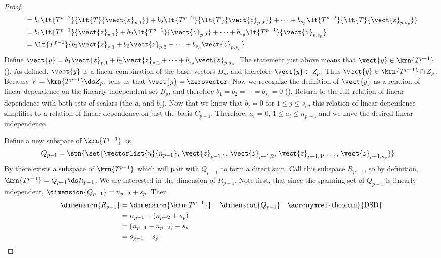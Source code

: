 \begin{proof}
\begin{align*}
%
&=
b_1\lt{T^{p-2}}{\lt{T}{\vect{z}_{p,1}}}+
b_2\lt{T^{p-2}}{\lt{T}{\vect{z}_{p,2}}}+
\cdots+
b_{s_p}\lt{T^{p-2}}{\lt{T}{\vect{z}_{p,s_p}}}\\
%
&=
b_1\lt{T^{p-1}}{\vect{z}_{p,1}}+
b_2\lt{T^{p-1}}{\vect{z}_{p,2}}+
\cdots+
b_{s_p}\lt{T^{p-1}}{\vect{z}_{p,s_p}}\\
%
&=
\lt{T^{p-1}}{
b_1\vect{z}_{p,1}+
b_2\vect{z}_{p,2}+
\cdots+
b_{s_p}\vect{z}_{p,s_p}
}
\end{align*}
%
Define
$\vect{y}=
b_1\vect{z}_{p,1}+b_2\vect{z}_{p,2}+\cdots+b_{s_p}\vect{z}_{p,s_p}$.
The statement just above means that $\vect{y}\in\krn{T^{p-1}}$  ().  As defined, $\vect{y}$ is a linear combination of the basis vectors $B_p$, and therefore $\vect{y}\in Z_p$.  Thus $\vect{y}\in\krn{T^{p-1}}\cap Z_p$.  Because $V=\krn{T^{p-1}}\ds Z_p$,  tells us that $\vect{y}=\zerovector$.  Now we recognize the definition of $\vect{y}$ as a relation of linear dependence on the linearly independent set $B_p$, and therefore $b_1=b_2=\cdots=b_{s_p}=0$ ().  Return to the full relation of linear dependence with both sets of scalars (the $a_i$ and $b_j$).  Now that we know that $b_j=0$ for $1\leq j\leq s_p$, this relation of linear dependence simplifies to a relation of linear dependence on just the basis $C_{p-1}$.  Therefore, $a_i=0$, $1\leq a_i\leq n_{p-1}$ and we have the desired linear independence.\par
%
Define a new subspace of $\krn{T^{p-1}}$ as
%
\begin{align*}
Q_{p-1}
&=
\spn{\set{
\vectorlist{u}{n_{p-1}},\,
\vect{z}_{p-1,1},\,\vect{z}_{p-1,2},\,\vect{z}_{p-1,3},\,\dots,\,\vect{z}_{p-1,s_p}
}}
\end{align*}
%
By  there exists a subspace of $\krn{T^{p-1}}$ which will pair with $Q_{p-1}$ to form a direct sum.  Call this subspace $R_{p-1}$, so by definition, $\krn{T^{p-1}}=Q_{p-1}\ds R_{p-1}$.  We are interested in the dimension of $R_{p-1}$.  Note first, that since the spanning set of $Q_{p-1}$ is linearly independent, $\dimension{Q_{p-1}}=n_{p-2}+s_p$.  Then
%
\begin{align*}
\dimension{R_{p-1}}
&=\dimension{\krn{T^{p-1}}}-\dimension{Q_{p-1}}&&\text{\acronymref{theorem}{DSD}}\\
&=n_{p-1}-\left(n_{p-2}+s_p\right)\\
&=\left(n_{p-1}-n_{p-2}\right)-s_p\\
&=s_{p-1}-s_p
\end{align*}

\end{proof}
